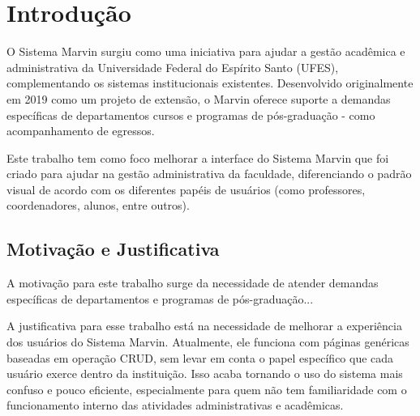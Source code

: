 \chapter{Introdução}
\label{sec-intro}




O Sistema Marvin surgiu como uma iniciativa para ajudar a gestão acadêmica e administrativa da Universidade Federal do Espírito Santo (UFES), complementando os sistemas institucionais existentes. Desenvolvido originalmente em 2019 como um projeto de extensão, o Marvin oferece suporte a demandas específicas de departamentos cursos e programas de pós-graduação - como acompanhamento de egressos.

Este trabalho tem como foco melhorar a interface do Sistema Marvin que foi criado para ajudar na gestão administrativa da faculdade, diferenciando o padrão visual de acordo com os diferentes papéis de usuários (como professores, coordenadores, alunos, entre outros).

\section{Motivação e Justificativa}
\label{sec-intro-motjus}


A motivação para este trabalho surge da necessidade de atender demandas específicas de departamentos e programas de pós-graduação...

A justificativa para esse trabalho está na necessidade de melhorar a experiência dos usuários do Sistema Marvin. Atualmente, ele funciona com páginas genéricas baseadas em operação CRUD, sem levar em conta o papel específico que cada usuário exerce dentro da instituição. Isso acaba tornando o uso do sistema mais confuso e pouco eficiente, especialmente para quem não tem familiaridade com o funcionamento interno das atividades administrativas e acadêmicas.

